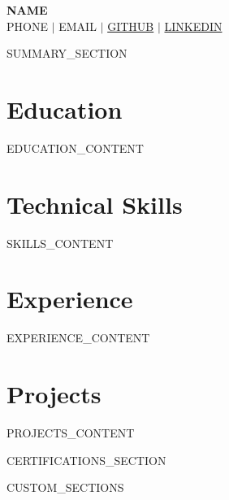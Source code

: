 \documentclass[11pt,a4paper]{article}
\begin{document}
\begin{center}
    {\LARGE \textbf{{{NAME}}}} \\[4pt]
    {{PHONE}} \;$|$\; {{EMAIL}} \;$|$\; \href{https://{{GITHUB}}}{{{GITHUB}}} \;$|$\; \href{https://{{LINKEDIN}}}{{{LINKEDIN}}}
\end{center}

\vspace{-2pt}

{{SUMMARY_SECTION}}

\section{Education}
{{EDUCATION_CONTENT}}

\section{Technical Skills}
{{SKILLS_CONTENT}}

\section{Experience}
{{EXPERIENCE_CONTENT}}

\section{Projects}
{{PROJECTS_CONTENT}}

{{CERTIFICATIONS_SECTION}}

{{CUSTOM_SECTIONS}}
\end{document}
